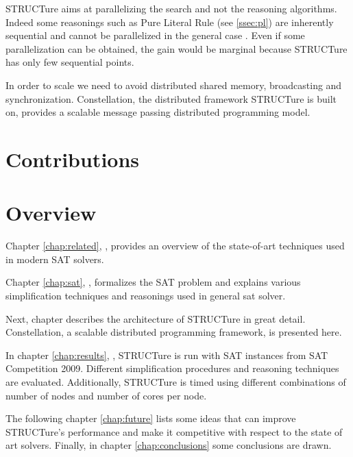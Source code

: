 STRUCTure aims at parallelizing the search and not the reasoning
algorithms. Indeed some reasonings such as Pure Literal Rule (see
\ref{ssec:pl}) are inherently sequential and cannot be parallelized
in the general case \cite{Johannsen:2005:CPL:1166822.1166834}. Even
if some parallelization can be obtained, the gain would be marginal
because STRUCTure has only few sequential points.

In order to scale we need to avoid distributed shared memory,
broadcasting and synchronization. Constellation, the distributed
framework STRUCTure is built on, provides a scalable message passing
distributed programming model.

\section{Contributions}

\section{Overview}

Chapter \ref{chap:related}, , provides an
overview of the state-of-art techniques used in modern SAT solvers.

Chapter \ref{chap:sat}, ,
formalizes the SAT problem and explains various simplification
techniques and reasonings used in general sat solver.

Next, chapter  describes the
architecture of STRUCTure in great detail. Constellation, a scalable
distributed programming framework, is presented here.

In chapter \ref{chap:results}, , STRUCTure
is run with SAT instances from SAT Competition 2009. Different
simplification procedures and reasoning techniques are evaluated.
Additionally, STRUCTure is timed using different combinations of
number of nodes and number of cores per node.

The following chapter \ref{chap:future} lists some ideas that can
improve STRUCTure's performance and make it competitive with respect
to the state of art solvers. Finally, in chapter \ref{chap:conclusions}
some conclusions are drawn.
